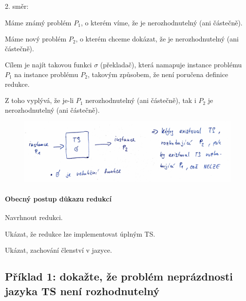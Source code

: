 \begin{compactitem}
    \item 2. směr: \begin{compactitem}
        \item Máme známý problém $P_1$, o kterém víme, že je nerozhodnutelný (ani částečně).

        \item Máme nový problém $P_2$, o kterém chceme dokázat, že je nerozhodnutelný (ani částečně).

        \item Cílem je najít takovou funkci $\sigma$ (překladač), která namapuje instance problému $P_1$ na instance problému $P_2$, takovým způsobem, že není poručena definice redukce.

        \item Z toho vyplývá, že je-li $P_1$ nerozhodnutelný (ani částečně), tak i $P_2$ je nerozhodnutelný (ani částečně).
    \end{compactitem}

    \begin{figure}[H]
        \centering
        \includegraphics[width=1\linewidth]{redukce_2.pdf}
    \end{figure}
\end{compactitem}

\paragraph*{Obecný postup důkazu redukcí} \begin{compactenum}
    \item Navrhnout redukci.
    \item Ukázat, že redukce lze implementovat úplným TS.
    \item Ukázat, zachování členství v jazyce.
\end{compactenum}

\subsection*{Příklad 1: dokažte, že problém neprázdnosti jazyka TS není rozhodnutelný}

